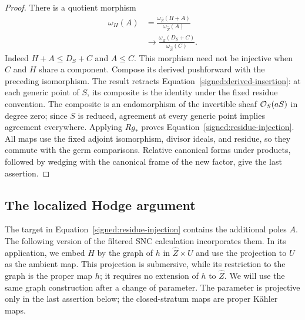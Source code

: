 \begin{proof}
There is a quotient morphism
\begin{equation}\label{signed:quotient-map}
\begin{aligned}
 \omega_H(A)&=
 \frac{\omega_{\widehat Z}(H+A)}{\omega_{\widehat Z}(A)}
 \\
 &\longrightarrow
 \frac{\omega_{\widehat Z}(D_S+C)}{\omega_{\widehat Z}(C)}.
\end{aligned}
\end{equation}
Indeed \(H+A\leq D_S+C\) and \(A\leq C\).  This morphism
need not be injective when \(C\) and \(H\) share a component.
Compose its derived pushforward with the preceding isomorphism.
The result retracts Equation~\eqref{signed:derived-insertion}:
at each generic point of \(S\), its composite is the identity
under the fixed residue convention.  The composite is an
endomorphism of the invertible sheaf \(\mathcal O_S(aS)\) in degree
zero; since \(S\) is reduced, agreement at every generic point
implies agreement everywhere.  Applying \(Rg_*\) proves
Equation~\eqref{signed:residue-injection}.  All maps use the
fixed adjoint isomorphism, divisor ideals, and residue, so they
commute with the germ comparisons.  Relative canonical forms
under products, followed by wedging with the canonical frame
of the new factor, give the last assertion.
\end{proof}

\subsection{The localized Hodge argument}

The target in Equation~\eqref{signed:residue-injection} contains
the additional poles \(A\).  The following version of the filtered
SNC calculation incorporates them.  In its application, we embed \(H\)
by the graph of \(h\) in \(\widehat Z\times U\) and use the projection to
\(U\) as the ambient map.  This projection is submersive, while its
restriction to the graph is the proper map \(h\); it requires no extension
of \(h\) to \(\widehat Z\).  We will use the same graph construction after
a change of parameter.  The parameter is projective only in the last
assertion below; the closed-stratum maps are proper Kähler maps.

